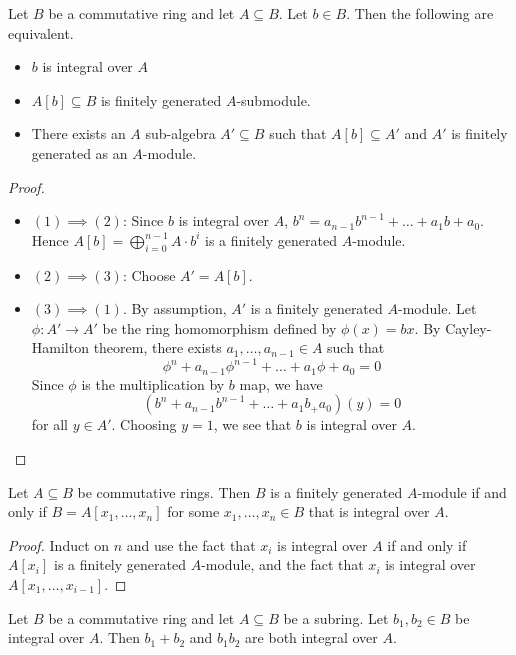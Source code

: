 \documentclass[a4paper]{article}
\begin{document}
\begin{prp}{}{} Let $B$ be a commutative ring and let $A\subseteq B$. Let $b\in B$. Then the following are equivalent. 
\begin{itemize}
\item $b$ is integral over $A$
\item $A[b]\subseteq B$ is finitely generated $A$-submodule. 
\item There exists an $A$ sub-algebra $A'\subseteq B$ such that $A[b]\subseteq A'$ and $A'$ is finitely generated as an $A$-module. 
\end{itemize} 
\begin{proof}\\
\begin{itemize}
\item $(1)\implies(2)$: Since $b$ is integral over $A$, $b^n=a_{n-1}b^{n-1}+\dots+a_1b+a_0$. Hence $A[b]=\bigoplus_{i=0}^{n-1}A\cdot b^i$ is a finitely generated $A$-module. 
\item $(2)\implies(3)$: Choose $A'=A[b]$. 
\item $(3)\implies(1)$. By assumption, $A'$ is a finitely generated $A$-module. Let $\phi:A'\to A'$ be the ring homomorphism defined by $\phi(x)=bx$. By Cayley-Hamilton theorem, there exists $a_1,\dots,a_{n-1}\in A$ such that $$\phi^n+a_{n-1}\phi^{n-1}+\dots+a_1\phi+a_0=0$$ Since $\phi$ is the multiplication by $b$ map, we have $$(b^n+a_{n-1}b^{n-1}+\dots+a_1b_+a_0)(y)=0$$ for all $y\in A'$. Choosing $y=1$, we see that $b$ is integral over $A$. 
\end{itemize}
\end{proof}
\end{prp}

\begin{lmm}{}{} Let $A\subseteq B$ be commutative rings. Then $B$ is a finitely generated $A$-module if and only if $B=A[x_1,\dots,x_n]$ for some $x_1,\dots,x_n\in B$ that is integral over $A$. 
\begin{proof}
Induct on $n$ and use the fact that $x_i$ is integral over $A$ if and only if $A[x_i]$ is a finitely generated $A$-module, and the fact that $x_i$ is integral over $A[x_1,\dots,x_{i-1}]$. 
\end{proof}
\end{lmm}

\begin{prp}{}{} Let $B$ be a commutative ring and let $A\subseteq B$ be a subring. Let $b_1,b_2\in B$ be integral over $A$. Then $b_1+b_2$ and $b_1b_2$ are both integral over $A$. 
\end{prp}
\end{document}
